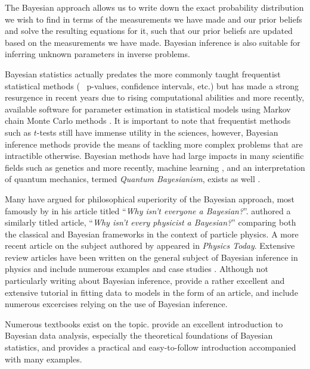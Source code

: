 The Bayesian approach allows us to write down the exact probability distribution we wish to find in terms of the measurements we have made and our prior beliefs and solve the resulting equations for it, such that our prior beliefs are updated based on the measurements we have made. Bayesian inference is also suitable for inferring unknown parameters in inverse problems.

Bayesian statistics actually predates the more commonly taught frequentist statistical methods (\eg~ p-values, confidence intervals, etc.) but has made a strong resurgence in recent years due to rising computational abilities and more recently, available software for parameter estimation in statistical models using Markov chain Monte Carlo methods \citep{Brooks03}. It is important to note that frequentist methods such as $t$-tests still have immense utility in the sciences, however, Bayesian inference methods provide the means of tackling more complex problems that are intractible otherwise. Bayesian methods have had large impacts in many scientific fields such as genetics \citep{Beaumont04} and more recently, machine learning \citep{Murphy12}, and an interpretation of quantum mechanics, termed \emph{Quantum Bayesianism}, exists as well \citep{Timpson08}. 

Many have argued for philosophical superiority of the Bayesian approach, most famously by \citet{Efron86} in his article titled ``\textit{Why isn't everyone a Bayesian?}''. \citet{Cousins95} authored a similarly titled article, ``\textit{Why isn't every physicist a Bayesian?}'' comparing both the classical and Bayesian frameworks in the context of particle physics. A more recent article on the subject authored by \citet{Lyons12} appeared in \emph{Physics Today}. Extensive review articles have been written on the general subject of Bayesian inference in physics and include numerous examples and case studies \citet{vonToussaint11,Dose03,Dagostini03}. Although not particularly writing about Bayesian inference, \citet{Hogg10} provide a rather excellent and extensive tutorial in fitting data to models in the form of an article, and include numerous excercises relying on the use of Bayesian inference.

Numerous textbooks exist on the topic. \citet{Gelman14} provide an excellent introduction to Bayesian data analysis, especially the theoretical foundations of Bayesian statistics, and \citet{Kruschke14} provides a practical and easy-to-follow introduction accompanied with many examples.


